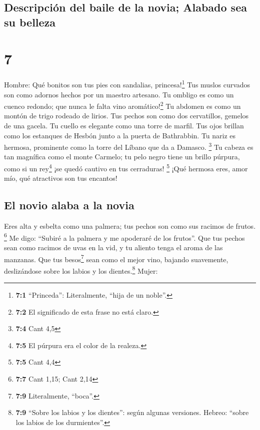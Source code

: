 \hypertarget{descripciuxf3n-del-baile-de-la-novia-alabado-sea-su-belleza}{%
\subsection{Descripción del baile de la novia; Alabado sea su
belleza}\label{descripciuxf3n-del-baile-de-la-novia-alabado-sea-su-belleza}}

\hypertarget{section-6}{%
\section{7}\label{section-6}}

Hombre:  Qué bonitos son tus pies con sandalias,
princesa!\footnote{\textbf{7:1} ``Princeda'': Literalmente, ``hija de un
  noble''.} Tus muslos curvados son como adornos hechos por un maestro
artesano.  Tu ombligo es como un cuenco redondo; que nunca
le falta vino aromático!\footnote{\textbf{7:2} El significado de esta
  frase no está claro.} Tu abdomen es como un montón de trigo rodeado de
lirios.  Tus pechos son como dos cervatillos, gemelos de
una gacela.  Tu cuello es elegante como una torre de
marfil. Tus ojos brillan como los estanques de Hesbón junto a la puerta
de Bathrabbin. Tu nariz es hermosa, prominente como la torre del Líbano
que da a Damasco. \footnote{\textbf{7:4} Cant 4,5}  Tu
cabeza es tan magnífica como el monte Carmelo; tu pelo negro tiene un
brillo púrpura, como si un rey\footnote{\textbf{7:5} El púrpura era el
  color de la realeza.} ¡se quedó cautivo en tus cerraduras! \footnote{\textbf{7:5}
  Cant 4,4}  ¡Qué hermosa eres, amor mío, qué atractivos
son tus encantos!

\hypertarget{el-novio-alaba-a-la-novia}{%
\subsection{El novio alaba a la novia}\label{el-novio-alaba-a-la-novia}}

 Eres alta y esbelta como una palmera; tus pechos son como
sus racimos de frutos. \footnote{\textbf{7:7} Cant 1,15; Cant 2,14}
 Me digo: ``Subiré a la palmera y me apoderaré de los
frutos''. Que tus pechos sean como racimos de uvas en la vid, y tu
aliento tenga el aroma de las manzanas.  Que tus
besos\footnote{\textbf{7:9} Literalmente, ``boca''.} sean como el mejor
vino, bajando suavemente, deslizándose sobre los labios y los
dientes.\footnote{\textbf{7:9} ``Sobre los labios y los dientes'': según
  algunas versiones. Hebreo: ``sobre los labios de los durmientes''.}
Mujer:

